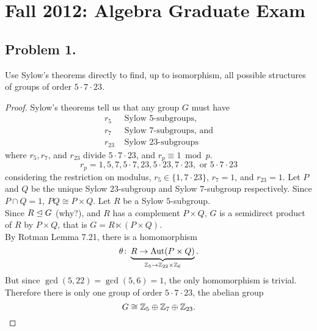 \documentclass{article}
\begin{document}
\section{Fall 2012: Algebra Graduate Exam}
\label{sec:fall2012}

\subsection{Problem 1.} {
  Use Sylow's theorems directly to find, up to isomorphism, all possible
  structures of groups of order $5 \cdot 7 \cdot 23$.
}
\begin{proof}
  Sylow's theorems tell us that any group $G$ must have \begin{align*}
    r_5 &\text{ Sylow } 5\text{-subgroups,} \\
    r_7 &\text{ Sylow } 7\text{-subgroups, and} \\
    r_{23} &\text{ Sylow } 23\text{-subgroups}
  \end{align*} where $r_5, r_7$, and $r_{23}$ divide $5 \cdot 7 \cdot 23$, and $r_p \equiv 1 \bmod p$. \[
    r_p = 1, 5, 7, 5 \cdot 7, 23, 5 \cdot 23, 7 \cdot 23, \text{ or } 5 \cdot 7 \cdot 23
  \] considering the restriction on modulus,
  $r_5 \in \{1, 7 \cdot 23\}$, $r_7 = 1$, and $r_{23} = 1$.
  Let $P$ and $Q$ be the unique Sylow $23$-subgroup and Sylow
  $7$-subgroup respectively.
  Since $P \cap Q = 1$, $PQ \cong P \times Q$. Let $R$ be a Sylow $5$-subgroup.
  \\
  Since $R \trianglelefteq G$ (why?), and $R$ has a complement $P \times Q$, $G$ is a
  semidirect product of $R$ by $P \times Q$, that is $G = R \ltimes (P \times Q)$.
  \\
  By Rotman Lemma 7.21, there is a homomorphism \[
    \theta\colon \underbrace{
      R \rightarrow \operatorname{Aut}(P \times Q)
    }_{\mathbb Z_5 \rightarrow \mathbb Z_{22} \times \mathbb Z_6}.
  \]
  But since $\gcd(5, 22) = \gcd(5, 6) = 1$, the only homomorphism is trivial.
  Therefore there is only one group of order $5 \cdot 7 \cdot 23$, the abelian
  group \[
    G \cong \mathbb Z_5 \oplus \mathbb Z_7 \oplus \mathbb Z_{23}.
  \]
\end{proof}
\pagebreak
\end{document}
